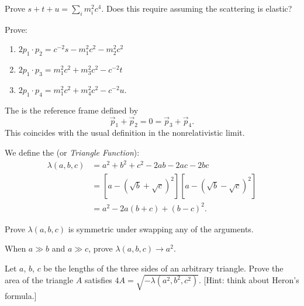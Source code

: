 \begin{exercise}
Prove $s+t+u=\sum_{i}m_{i}^{2}c^{4}$. Does this require assuming the
scattering is elastic?
\end{exercise}

\begin{exercise}
  Prove:
  \begin{enumerate}
  \item $2p_{1}\cdot p_{2} = c^{-2}s - m_{1}^{2}c^{2} - m_{2}^{2}c^{2}$
  \item $2p_{1}\cdot p_{3} = m_{1}^{2}c^{2} + m_{3}^{2}c^{2} - c^{-2}t$
  \item $2p_{1}\cdot p_{4} = m_{1}^{2}c^{2} + m_{4}^{2}c^{2} - c^{-2}u$.
  \end{enumerate}
\end{exercise}

\begin{definition}
The  is the reference frame defined by
\begin{equation}
\vec{p}_{1}+\vec{p}_{2} = 0 = \vec{p}_{3}+\vec{p}_{4}.
\end{equation}
This coincides with the usual definition in the nonrelativistic limit.
\end{definition}

\begin{definition}\label{defn:relativity:scattering:kallen-function}
We define the  (or \emph{Triangle Function}):
\begin{subequations}
\begin{align}
\lambda(a,b,c) &= a^{2}+b^{2}+c^{2}-2ab-2ac-2bc\\
&=\left[a-(\sqrt{b}+\sqrt{c})^{2}\right]\left[a-(\sqrt{b}-\sqrt{c})^{2}\right]\\
&=a^{2}-2a(b+c) + (b-c)^{2}.
\end{align}
\end{subequations}
\end{definition}

\begin{exercise}
Prove $\lambda(a,b,c)$ is symmetric under swapping any of the arguments.
\end{exercise}
\begin{exercise}
When $a\gg b$ and $a\gg c$, prove $\lambda(a,b,c)\to a^{2}$.
\end{exercise}

\begin{exercise}
Let $a$, $b$, $c$ be the lengths of the three sides of an arbitrary
triangle. Prove the area of the triangle $A$ satisfies
$4A=\sqrt{-\lambda(a^{2},b^{2},c^{2})}$. [Hint: think about Heron's formula.]
\end{exercise}


